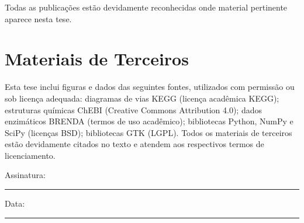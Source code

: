 \noindent Todas as publicações estão devidamente reconhecidas onde material
pertinente aparece nesta tese.

\section*{Materiais de Terceiros}

Esta tese inclui figuras e dados das seguintes fontes, utilizados com
permissão ou sob licença adequada: diagramas de vias KEGG (licença acadêmica
KEGG); estruturas químicas ChEBI (Creative Commons Attribution 4.0); dados
enzimáticos BRENDA (termos de uso acadêmico); bibliotecas Python, NumPy e SciPy
(licenças BSD); bibliotecas GTK (LGPL). Todos os materiais de terceiros estão
devidamente citados no texto e atendem aos respectivos termos de licenciamento.

\bigskip
\bigskip

\noindent Assinatura: \rule{6cm}{0.4pt}

\noindent Data: \rule{4cm}{0.4pt}
